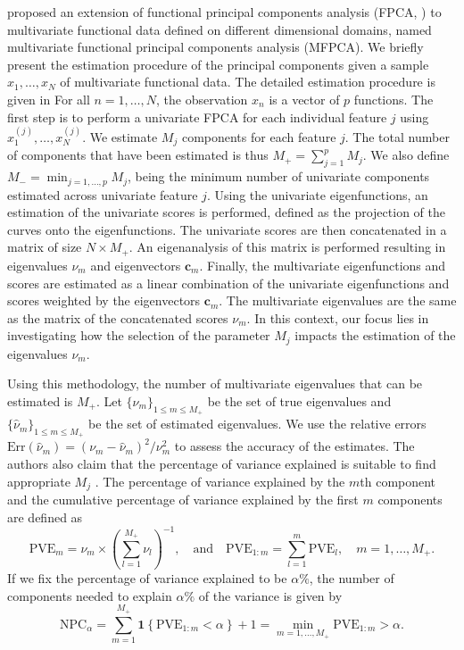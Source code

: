 \cite{happMultivariateFunctionalPrincipal2018} proposed an extension of functional principal components analysis (FPCA, \cite{ramsayFunctionalDataAnalysis2005}) to multivariate functional data defined on different dimensional domains, named multivariate functional principal components analysis (MFPCA). We briefly present the estimation procedure of the principal components given a sample $x_1, \dots, x_N$ of multivariate functional data. The detailed estimation procedure is given in \cite[Section 3]{happMultivariateFunctionalPrincipal2018} For all $n = 1, \dots, N$, the observation $x_n$ is a vector of $p$ functions. The first step is to perform a univariate FPCA for each individual feature $j$ using $x_1^{(j)}, \dots, x_N^{(j)}$. We estimate $M_j$ components for each feature $j$. The total number of components that have been estimated is thus $M_+ = \sum_{j = 1}^p M_j$. We also define $M_{-} = \min_{j = 1, \dots, p} M_j$, being the minimum number of univariate components estimated across univariate feature $j$. Using the univariate eigenfunctions, an estimation of the univariate scores is performed, defined as the projection of the curves onto the eigenfunctions. The univariate scores are then concatenated in a matrix of size $N \times M_+$. An eigenanalysis of this matrix is performed resulting in eigenvalues $\nu_m$ and eigenvectors $\mathbf{c}_m$. Finally, the multivariate eigenfunctions and scores are estimated as a linear combination of the univariate eigenfunctions and scores weighted by the eigenvectors $\mathbf{c}_m$. The multivariate eigenvalues are the same as the matrix of the concatenated scores $\nu_m$. In this context, our focus lies in investigating how the selection of the parameter $M_j$ impacts the estimation of the eigenvalues $\nu_m$.

Using this methodology, the number of multivariate eigenvalues that can be estimated is $M_+$. Let $\{\nu_m\}_{1 \leq m \leq M_+}$ be the set of true eigenvalues and $\{\widehat{\nu}_m\}_{1 \leq m \leq M_+}$ be the set of estimated eigenvalues. We use the relative errors $\text{Err}(\widehat{\nu}_m)  = (\nu_m - \widehat{\nu}_m)^2 / \nu^2_m$ to assess the accuracy of the estimates. The authors also claim that the percentage of variance explained is suitable to find appropriate $M_j$ \cite[Chapter 8.2]{ramsayFunctionalDataAnalysis2005}. The percentage of variance explained by the $m$th component and the cumulative percentage of variance explained by the first $m$ components are defined as
\begin{equation}\label{eq:pve}
     \text{PVE}_m = \nu_m \times \left(\sum_{l = 1}^{M_+} \nu_l\right)^{-1}, \quad\text{and}\quad \text{PVE}_{1:m} = \sum_{l = 1}^m \text{PVE}_l, \quad m = 1, \dots, M_+.
\end{equation}
If we fix the percentage of variance explained to be $\alpha\%$, the number of components needed to explain $\alpha\%$ of the variance is given by
\begin{equation}\label{eq:npc}
     \text{NPC}_{\alpha} = \sum_{m = 1}^{M_{+}} \mathbf{1}\left\{\text{PVE}_{1:m} < \alpha\right\} + 1 = \min_{m = 1, \dots, M_+} \text{PVE}_{1:m} > \alpha.
\end{equation}


